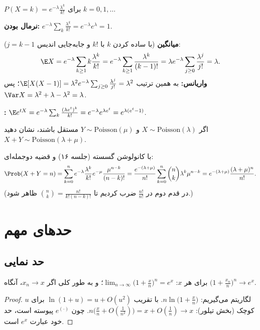 \begin{example}
$P(X=k)=e^{-\lambda}\frac{\lambda^k}{k!}$ برای $k=0,1,\ldots$
\begin{solution}
\textbf{نرمال بودن:} $e^{-\lambda}\sum_k\frac{\lambda^k}{k!}=e^{-\lambda}e^\lambda=1$.

\textbf{میانگین} (با ساده کردن $k$ با $k!$ و جابه‌جایی اندیس $j=k-1$):
\[
\E X=e^{-\lambda}\sum_{k\ge1}k\frac{\lambda^k}{k!}=e^{-\lambda}\sum_{k\ge1}\frac{\lambda^k}{(k-1)!}=\lambda e^{-\lambda}\sum_{j\ge0}\frac{\lambda^j}{j!}=\lambda .
\]
\textbf{واریانس:} به همین ترتیب $\E[X(X-1)]=\lambda^2e^{-\lambda}\sum_{j\ge0}\frac{\lambda^j}{j!}=\lambda^2$؛ پس $\Var X=\lambda^2+\lambda-\lambda^2=\lambda$.

\textbf{:} $\E e^{tX}=e^{-\lambda}\sum_k\frac{(\lambda e^t)^k}{k!}=e^{-\lambda}e^{\lambda e^t}=e^{\lambda(e^t-1)}$.
\end{solution}
\end{example}

\begin{example}
اگر $X\sim\mathrm{Poisson}(\lambda)$ و $Y\sim\mathrm{Poisson}(\mu)$ مستقل باشند، نشان دهید $X+Y\sim\mathrm{Poisson}(\lambda+\mu)$.
\begin{solution}
با کانولوشن گسسته (جلسه ۱۶) و قضیه دوجمله‌ای:
\[
\Prob(X+Y=n)=\sum_{k=0}^ne^{-\lambda}\frac{\lambda^k}{k!}e^{-\mu}\frac{\mu^{n-k}}{(n-k)!}=\frac{e^{-(\lambda+\mu)}}{n!}\sum_{k=0}^n\binom nk\lambda^k\mu^{n-k}=e^{-(\lambda+\mu)}\frac{(\lambda+\mu)^n}{n!}.
\]
(در قدم دوم در $\frac{n!}{n!}$ ضرب کردیم تا $\binom nk=\frac{n!}{k!(n-k)!}$ ظاهر شود.)
\end{solution}
\end{example}

\section{حدهای مهم}

\subsection{حد نمایی}
\begin{theorem}[حد نمایی]
برای هر $x$: $\displaystyle\lim_{n\to\infty}\Big(1+\frac xn\Big)^n=e^x$؛ و به طور کلی اگر $x_n\to x$، آنگاه $\big(1+\frac{x_n}{n}\big)^n\to e^x$.
\end{theorem}
\begin{proof}
لگاریتم می‌گیریم: $n\ln\big(1+\frac xn\big)$. با تقریب $\ln(1+u)=u+O(u^2)$ برای $u$ کوچک (بخش تیلور): $n\big(\frac xn+O(\frac1{n^2})\big)=x+O(\frac1n)\to x$. چون $e^{(\cdot)}$ پیوسته است، حد خود عبارت $e^x$ است.
\end{proof}

